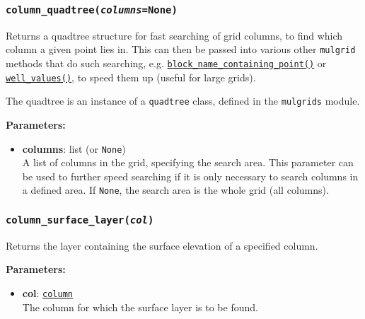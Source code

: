 \begin{snugshade}\subsubsection{\texttt{column\_quadtree(\emph{columns}=None)}}\end{snugshade}
\label{sec:mulgrid:column_quadtree}

Returns a quadtree structure for fast searching of grid columns, to find which column a given point lies in.  This can then be passed into various other \texttt{mulgrid} methods that do such searching, e.g. \hyperref[sec:mulgrid:block_name_containing_point]{\texttt{block\_name\_containing\_point()}} or \hyperref[sec:mulgrid:well_values]{\texttt{well\_values()}}, to speed them up (useful for large grids).

The quadtree is an instance of a \texttt{quadtree} class, defined in the \texttt{mulgrids} module.

\textbf{Parameters:}
\begin{itemize}
\item \textbf{columns}: list (or \texttt{None})\\
  A list of columns in the grid, specifying the search area.  This parameter can be used to further speed searching if it is only necessary to search columns in a defined area.  If \texttt{None}, the search area is the whole grid (all columns).
\end{itemize}

\begin{snugshade}\subsubsection{\texttt{column\_surface\_layer(\emph{col})}}\end{snugshade}
\label{sec:mulgrid:column_surface_layer}

Returns the layer containing the surface elevation of a specified column.

\textbf{Parameters:}
\begin{itemize}
\item \textbf{col}: \hyperref[columnobjects]{\texttt{column}}\\
  The column for which the surface layer is to be found.
\end{itemize}

